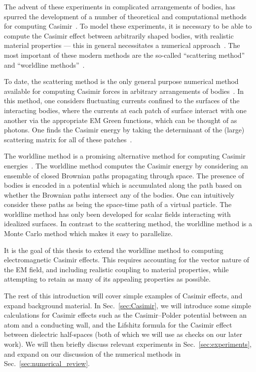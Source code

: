 The advent of these experiments in complicated arrangements of bodies, has spurred the development
of a number of theoretical and computational methods for computing Casimir~\cite{Dalvit2011,Bordag2009}. 
To model these experiments, it is necessary to be able to compute the Casimir effect between arbitrarily shaped bodies, with 
realistic material properties --- this in general necessitates a numerical approach~\cite{Johnson2011}.
The most important of these modern methods are the so-called ``scattering method''~\cite{Lambrecht2006,Rahi2009,Reid2009}
 and ``worldline methods''~\cite{Gies2003}.

To date, the scattering method is the only general purpose numerical method available for computing
Casimir forces in arbitrary arrangements of bodies~\cite{Reid2009,Reid2011,Reid2013}.  
In this method, one considers fluctuating currents confined to the surfaces of the interacting bodies,
where the currents at each patch of surface interact with one another via the appropriate EM Green functions,
which can be thought of as photons.  One finds the Casimir energy by taking the determinant 
of the (large) scattering matrix for all of these patches~\cite{Reid2011}.  

The worldline method is a promising alternative method for computing Casimir energies~\cite{Gies2003}.  
The worldline method computes the Casimir energy by considering an ensemble of closed 
Brownian paths propagating through space.  The presence of bodies is encoded in a potential which is
accumulated along the path based on whether the Brownian paths intersect any of the bodies.  One can
intuitively consider these paths as being the space-time path of a virtual particle.  
The worldline method has only been developed for scalar fields interacting with idealized surfaces.
In contrast to the scattering method, the worldline method is a Monte Carlo method which makes it 
easy to parallelize.  

It is the goal of this thesis to extend the worldline method to computing electromagnetic Casimir effects.
This requires accounting for the vector nature of the EM field, and including realistic coupling to 
material properties, while attempting to retain as many of its appealing
properties as possible.    

The rest of this introduction will cover simple examples of Casimir effects, and expand background material.
In Sec.~\ref{sec:Casimir}, we will introduce some simple calculations for Casimir effects such as
the Casimir--Polder potential between an atom and a conducting wall, and the Lifshitz formula for the Casimir
effect between dielectric half-spaces (both of which we will use as checks on our later work).
We will then briefly discuss relevant experiments in Sec.~\ref{sec:experiments}, and expand on our discussion
of the numerical methods in Sec.~\ref{sec:numerical_review}.  

